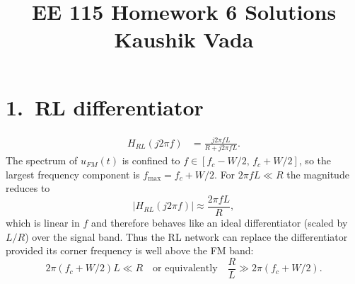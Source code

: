 \documentclass[11pt]{article}
\begin{document}
\title{EE 115 Homework 6 Solutions\\Kaushik Vada}
\author{}
\date{}
\maketitle

\section*{1.\ RL differentiator}
\begin{align}
H_{RL}(j2\pi f) &= \frac{j2\pi fL}{R + j2\pi fL}.
\end{align}
The spectrum of $u_{FM}(t)$ is confined to $f \in [f_c - W/2,\, f_c + W/2]$, so the
largest frequency component is $f_{\max} = f_c + W/2$. For $2\pi fL \ll R$ the magnitude
reduces to
\[
|H_{RL}(j2\pi f)| \approx \frac{2\pi fL}{R},
\]
which is linear in $f$ and therefore behaves like an ideal differentiator (scaled by $L/R$)
over the signal band. Thus the RL network can replace the differentiator provided its corner
frequency is well above the FM band:
\[
\boxed{2\pi(f_c + W/2)L \ll R \quad \text{or equivalently} \quad \frac{R}{L} \gg 2\pi(f_c + W/2)}.
\]
\end{document}
